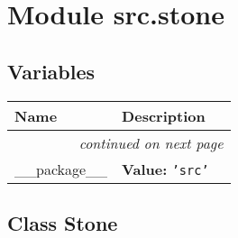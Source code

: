 %
%
%


\section{Module src.stone}

    \label{src:stone}


  \subsection{Variables}

    \vspace{-1cm}
\hspace{\varindent}\begin{longtable}{|p{\varnamewidth}|p{\vardescrwidth}|l}
\cline{1-2}
\cline{1-2} \centering \textbf{Name} & \centering \textbf{Description}& \\
\cline{1-2}
\endhead\cline{1-2}\multicolumn{3}{r}{\small\textit{continued on next page}}\\\endfoot\cline{1-2}
\endlastfoot\raggedright \_\-\_\-p\-a\-c\-k\-a\-g\-e\-\_\-\_\- & \raggedright \textbf{Value:} 
{\tt \texttt{'}\texttt{src}\texttt{'}}&\\
\cline{1-2}
\end{longtable}



\subsection{Class Stone}

